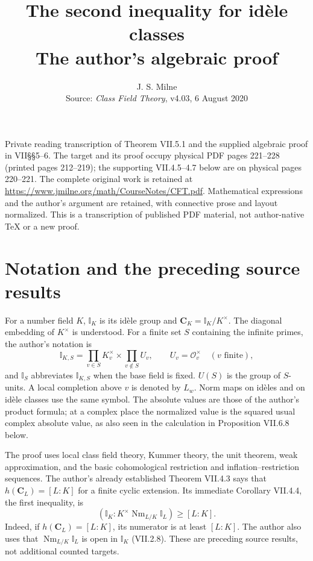\documentclass[11pt]{article}
\title{The second inequality for id\`ele classes\\The author's algebraic proof}
\author{J. S. Milne\\\small Source: \emph{Class Field Theory}, v4.03, 6 August 2020}
\date{}
\newcommand{\I}{\mathbb I}
\newcommand{\C}{\mathbf C}
\newcommand{\Nm}{\operatorname{Nm}}
\begin{document}
\maketitle
\noindent\small
Private reading transcription of Theorem VII.5.1 and the supplied algebraic
proof in VII\S\S5--6. The target and its proof occupy physical PDF pages
221--228 (printed pages 212--219); the supporting VII.4.5--4.7 below are on
physical pages 220--221. The complete original work is retained at
\url{https://www.jmilne.org/math/CourseNotes/CFT.pdf}.
Mathematical expressions and the author's argument are retained, with
connective prose and layout normalized. This is a transcription of published
PDF material, not author-native TeX or a new proof.
\normalsize

\section*{Notation and the preceding source results}
For a number field $K$, $\I_K$ is its id\`ele group and
$\C_K=\I_K/K^\times$. The diagonal embedding of $K^\times$ is understood.
For a finite set $S$ containing the infinite primes, the author's notation is
\[
 \I_{K,S}=\prod_{v\in S}K_v^\times\times\prod_{v\notin S}U_v,
 \qquad U_v=\mathcal O_v^\times\quad(v\text{ finite}),
\]
and $\I_S$ abbreviates $\I_{K,S}$ when the base field is fixed.
$U(S)$ is the group of $S$-units. A local completion above $v$ is denoted by
$L_w$. Norm maps on id\`eles and on id\`ele classes use the same symbol.
The absolute values are those of the author's product formula; at a complex
place the normalized value is the squared usual complex absolute value, as
also seen in the calculation in Proposition VII.6.8 below.

The proof uses local class field theory, Kummer theory, the unit theorem,
weak approximation, and the basic cohomological restriction and
inflation--restriction sequences. The author's already established
Theorem VII.4.3 says that $h(\C_L)=[L:K]$ for a finite cyclic extension.
Its immediate Corollary VII.4.4, the first inequality, is
\[
 (\I_K:K^\times\Nm_{L/K}\I_L)\ge [L:K].
\]
Indeed, if $h(\C_L)=[L:K]$, its numerator is at least $[L:K]$.
The author also uses that $\Nm_{L/K}\I_L$ is open in $\I_K$ (VII.2.8).
These are preceding source results, not additional counted targets.
\end{document}
